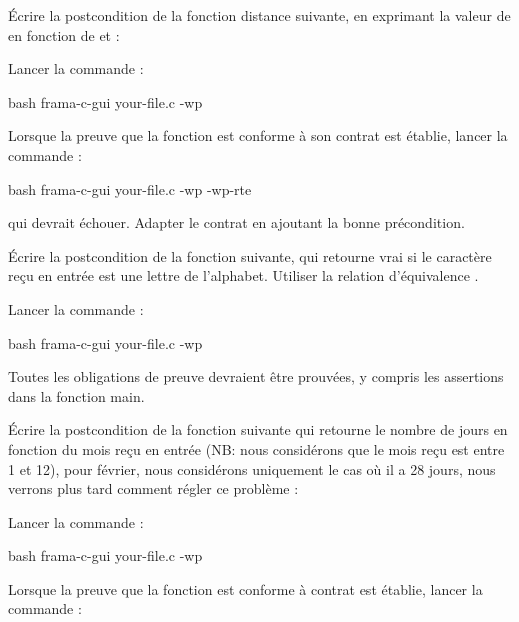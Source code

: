 

Écrire la postcondition de la fonction distance suivante, en exprimant
la valeur de  en fonction de  et
 :




Lancer la commande :


\begin{CodeBlock}{bash}
frama-c-gui your-file.c -wp
\end{CodeBlock}


Lorsque la preuve que la fonction est conforme à son contrat est établie, lancer
la commande :

\begin{CodeBlock}{bash}
frama-c-gui your-file.c -wp -wp-rte
\end{CodeBlock}


qui devrait échouer. Adapter le contrat en ajoutant la bonne précondition.




Écrire la postcondition de la fonction suivante, qui retourne vrai si le
caractère reçu en entrée est une lettre de l'alphabet. Utiliser la relation
d'équivalence  \CodeInline{<==>}.




Lancer la commande :


\begin{CodeBlock}{bash}
frama-c-gui your-file.c -wp
\end{CodeBlock}


Toutes les obligations de preuve devraient être prouvées, y compris les
assertions dans la fonction main.




Écrire la postcondition de la fonction suivante qui retourne le nombre de
jours en fonction du mois reçu en entrée (NB: nous considérons que le mois
reçu est entre 1 et 12), pour février, nous considérons uniquement le cas
où il a 28 jours, nous verrons plus tard comment régler ce problème :




Lancer la commande :


\begin{CodeBlock}{bash}
frama-c-gui your-file.c -wp
\end{CodeBlock}


Lorsque la preuve que la fonction est conforme à contrat est établie, lancer
la commande :

